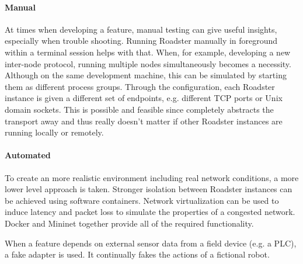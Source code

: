 \paragraph{Manual} At times when developing a feature, manual testing can give
useful insights, especially when trouble shooting. Running Roadster manually in
foreground within a terminal session helps with that.  When, for example,
developing a new inter-node protocol, running multiple nodes simultaneously
becomes a necessity. Although on the same development machine, this can be
simulated by starting them as different process groups. Through the
configuration, each Roadster instance is given a different set of endpoints,
e.g. different TCP ports or Unix domain sockets. This is possible and feasible
since \zmq completely abstracts the transport away and thus really doesn't
matter if other Roadster instances are running locally or remotely.

\paragraph{Automated} To create an more realistic environment including real
network conditions, a more lower level approach is taken. Stronger isolation
between Roadster instances can be achieved using software containers. Network
virtualization can be used to induce latency and packet loss to simulate the
properties of a congested network.
Docker and Mininet together provide all of the required functionality.

When a feature depends on external sensor data from a field device (e.g. a \gls{PLC}),
a fake adapter is used. It continually fakes the actions of a fictional robot.

